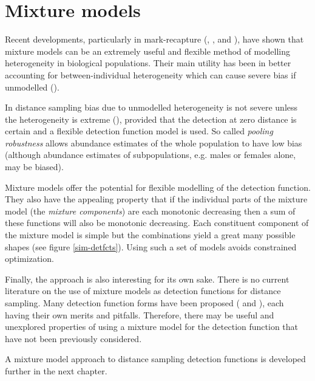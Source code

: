 \section{Mixture models}

Recent developments, particularly in mark-recapture (\cite{pledger2000}, \cite{dorazio03}, \cite{pledger2005} and \cite{morgan08}), have shown that mixture models can be an extremely useful and flexible method of modelling heterogeneity in biological populations. Their main utility has been in better accounting for between-individual heterogeneity which can cause severe bias if unmodelled (\cite{Link2003}). 

In distance sampling bias due to unmodelled heterogeneity is not severe unless the heterogeneity is extreme (\cite[pp. 389-392]{ADS}), provided that the detection at zero distance is certain and a flexible detection function model is used. So called \textit{pooling robustness} allows abundance estimates of the whole population to have low bias (although abundance estimates of subpopulations, e.g. males or females alone, may be biased). 

Mixture models offer the potential for flexible modelling of the detection function. They also have the appealing property that if the individual parts of the mixture model (the \textit{mixture components}) are each monotonic decreasing then a sum of these functions will also be monotonic decreasing. Each constituent component of the mixture model is simple but the combinations yield a great many possible shapes (see figure \ref{sim-detfcts}). Using such a set of models avoids constrained optimization.


Finally, the approach is also interesting for its own sake. There is no current literature on the use of mixture models as detection functions for distance sampling. Many detection function forms have been proposed (\cite{buckland92} and  \cite{gammadetfct}), each having their own merits and pitfalls. Therefore, there may be useful and unexplored properties of using a mixture model for the detection function that have not been previously considered.

A mixture model approach to distance sampling detection functions is developed further in the next chapter.

